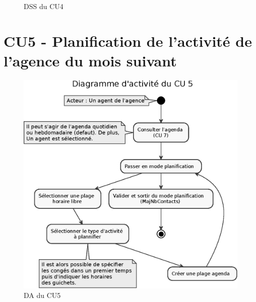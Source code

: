 \begin{figure}[H]
\noindent{}
\caption{DSS du CU4}
\end{figure}



\clearpage
\section{CU5 - Planification de l’activité de l’agence du mois suivant}

\begin{figure}[H]
\centering
\includegraphics[width=\textwidth]{figures/eps/DA_CU5.eps}
\caption{DA du CU5}
\end{figure}


